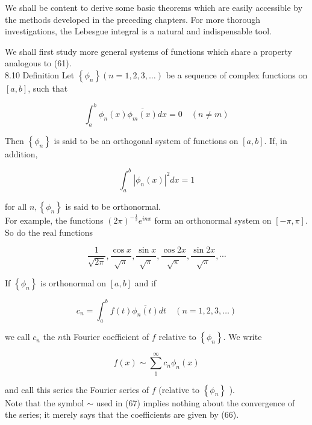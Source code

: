 \documentclass[10pt]{article}
\begin{document}
We shall be content to derive some basic theorems which are easily accessible by the methods developed in the preceding chapters. For more thorough investigations, the Lebesgue integral is a natural and indispensable tool.

We shall first study more general systems of functions which share a property analogous to (61).\\
8.10 Definition Let $\left\{\phi_{n}\right\}(n=1,2,3, \ldots)$ be a sequence of complex functions on $[a, b]$, such that


\begin{equation*}
\int_{a}^{b} \phi_{n}(x) \overline{\phi_{m}(x)} d x=0 \quad(n \neq m) \tag{64}
\end{equation*}


Then $\left\{\phi_{n}\right\}$ is said to be an orthogonal system of functions on $[a, b]$. If, in addition,


\begin{equation*}
\int_{a}^{b}\left|\phi_{n}(x)\right|^{2} d x=1 \tag{65}
\end{equation*}


for all $n,\left\{\phi_{n}\right\}$ is said to be orthonormal.\\
For example, the functions $(2 \pi)^{-\frac{1}{2}} e^{i n x}$ form an orthonormal system on $[-\pi, \pi]$. So do the real functions

$$
\frac{1}{\sqrt{2 \pi}}, \frac{\cos x}{\sqrt{\pi}}, \frac{\sin x}{\sqrt{\pi}}, \frac{\cos 2 x}{\sqrt{\pi}}, \frac{\sin 2 x}{\sqrt{\pi}}, \cdots
$$

If $\left\{\phi_{n}\right\}$ is orthonormal on $[a, b]$ and if


\begin{equation*}
c_{n}=\int_{a}^{b} f(t) \overline{\phi_{n}(t)} d t \quad(n=1,2,3, \ldots) \tag{66}
\end{equation*}


we call $c_{n}$ the $n$th Fourier coefficient of $f$ relative to $\left\{\phi_{n}\right\}$. We write


\begin{equation*}
f(x) \sim \sum_{1}^{\infty} c_{n} \phi_{n}(x) \tag{67}
\end{equation*}


and call this series the Fourier series of $f$ (relative to $\left\{\phi_{n}\right\}$ ).\\
Note that the symbol $\sim$ used in (67) implies nothing about the convergence of the series; it merely says that the coefficients are given by (66).
\end{document}
